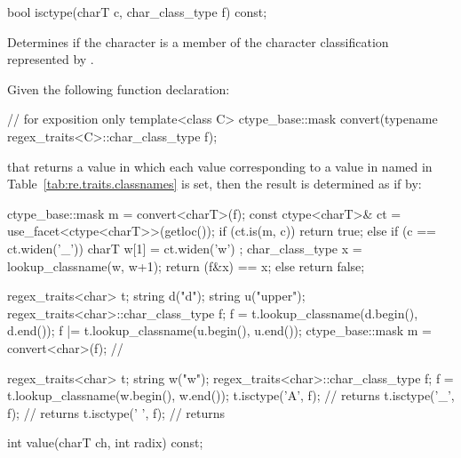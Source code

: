%
\begin{itemdecl}
bool isctype(charT c, char_class_type f) const; 
\end{itemdecl}

\begin{itemdescr}
\pnum
\effects  Determines if the character  is a member of the character
classification represented by .

\pnum
\returns Given the following function declaration:
\begin{codeblock}
// for exposition only
template<class C>
  ctype_base::mask convert(typename regex_traits<C>::char_class_type f);
\end{codeblock}
that returns a value in which each  value corresponding to
a value in  named in Table~\ref{tab:re.traits.classnames} is set, then the
result is determined as if by:
\begin{codeblock}
ctype_base::mask m = convert<charT>(f);
const ctype<charT>& ct = use_facet<ctype<charT>>(getloc());
if (ct.is(m, c)) {
  return true;
} else if (c == ct.widen('_')) {
  charT w[1] = { ct.widen('w') };
  char_class_type x = lookup_classname(w, w+1);
  return (f&x) == x;
} else {
  return false;
} 
\end{codeblock}
\begin{example}
\begin{codeblock}
regex_traits<char> t;
string d("d");
string u("upper");
regex_traits<char>::char_class_type f;
f = t.lookup_classname(d.begin(), d.end());
f |= t.lookup_classname(u.begin(), u.end());
ctype_base::mask m = convert<char>(f); // 
\end{codeblock}
\end{example}
\begin{example}
\begin{codeblock}
regex_traits<char> t;
string w("w");
regex_traits<char>::char_class_type f;
f = t.lookup_classname(w.begin(), w.end());
t.isctype('A', f); // returns 
t.isctype('_', f); // returns 
t.isctype(' ', f); // returns 
\end{codeblock}
\end{example}

\end{itemdescr}

%
\begin{itemdecl}
int value(charT ch, int radix) const;
\end{itemdecl}

